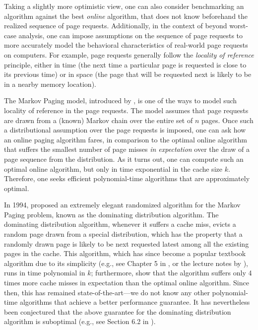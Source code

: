 \documentclass[11pt]{article}
\begin{document}
Taking a slightly more optimistic view, one can also consider benchmarking an algorithm against the best \textit{online} algorithm, that does not know beforehand the realized sequence of page requests. Additionally, in the context of beyond worst-case analysis, one can impose assumptions on the sequence of page requests to more accurately model the behavioral characteristics of real-world page requests on computers. For example, page requests generally follow the \textit{locality of reference} principle, either in time (the next time a particular page is requested is close to its previous time) or in space (the page that will be requested next is likely to be in a nearby memory location).

The Markov Paging model, introduced by \cite{karlin1992markov}, is one of the ways to model such locality of reference in the page requests. The model assumes that page requests are drawn from a (known) Markov chain over the entire set of $n$ pages. Once such a distributional assumption over the page requests is imposed, one can ask how an online paging algorithm fares, in comparison to the optimal online algorithm that suffers the smallest number of page misses \textit{in expectation} over the draw of a page sequence from the distribution. As it turns out, one can compute such an optimal online algorithm, but only in time exponential in the cache size $k$. Therefore, one seeks efficient polynomial-time algorithms that are approximately optimal.

In 1994, \cite{lund1994ip} proposed an extremely elegant randomized algorithm for the Markov Paging problem, known as the dominating distribution algorithm. The dominating distribution algorithm, whenever it suffers a cache miss, evicts a random page drawn from a special distribution, which has the property that a randomly drawn page is likely to be next requested latest among all the existing pages in the cache. This algorithm, which has since become a popular textbook algorithm due to its simplicity (e.g., see Chapter 5 in \cite{borodin2005online}, or the lecture notes by \cite{roughgardennotes}), runs in time polynomial in $k$; furthermore, \cite{lund1994ip} show that the algorithm suffers only 4 times more cache misses in expectation than the optimal online algorithm. Since then, this has remained state-of-the-art---we do not know any other polynomial-time algorithms that achieve a better performance guarantee. It has nevertheless been conjectured that the above guarantee for the dominating distribution algorithm is suboptimal (e.g., see Section 6.2 in \cite{roughgardennotes}).
\end{document}
